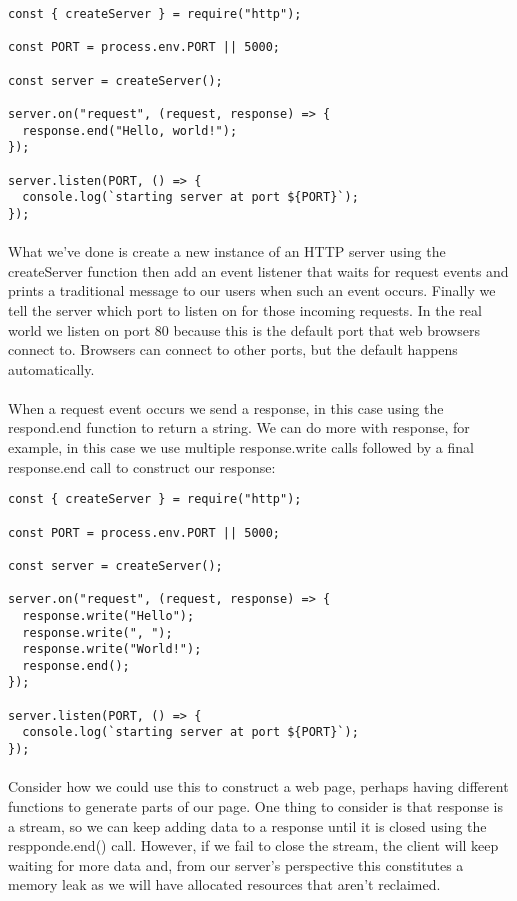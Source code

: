 \documentclass[10pt, a4paper, twosize]{article}
\begin{document}
\begin{lstlisting}
const { createServer } = require("http");

const PORT = process.env.PORT || 5000;

const server = createServer();

server.on("request", (request, response) => {
  response.end("Hello, world!");
});

server.listen(PORT, () => {
  console.log(`starting server at port ${PORT}`);
});
\end{lstlisting}

\paragraph{} What we've done is create a new instance of an HTTP server using the createServer function then add an event listener that waits for request events and prints a traditional message to our users when such an event occurs. Finally we tell the server which port to listen on for those incoming requests. In the real world we listen on port 80 because this is the default port that web browsers connect to. Browsers can connect to other ports, but the default happens automatically.

\paragraph{} When a request event occurs we send a response, in this case using the respond.end function to return a string. We can do more with response, for example, in this case we use multiple response.write calls followed by a final response.end call to construct our response:

\begin{lstlisting}
const { createServer } = require("http");

const PORT = process.env.PORT || 5000;

const server = createServer();

server.on("request", (request, response) => {
  response.write("Hello");
  response.write(", ");
  response.write("World!");
  response.end();
});

server.listen(PORT, () => {
  console.log(`starting server at port ${PORT}`);
});
\end{lstlisting}

\paragraph{} Consider how we could use this to construct a web page, perhaps having different functions to generate parts of our page. One thing to consider is that response is a stream, so we can keep adding data to a response until it is closed using the respponde.end() call. However, if we fail to close the stream, the client will keep waiting for more data and, from our server's perspective this constitutes a memory leak as we will have allocated resources that aren't reclaimed.
\end{document}
